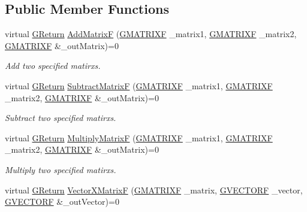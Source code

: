 \subsection*{Public Member Functions}
\begin{DoxyCompactItemize}
\item 
virtual \mbox{\hyperlink{namespace_g_w_a67a839e3df7ea8a5c5686613a7a3de21}{G\+Return}} \mbox{\hyperlink{class_g_w_1_1_m_a_t_h_1_1_g_matrix_a40f37f26a141222068d55994b8161cde}{Add\+MatrixF}} (\mbox{\hyperlink{struct_g_w_1_1_m_a_t_h_1_1_g_m_a_t_r_i_x_f}{G\+M\+A\+T\+R\+I\+XF}} \+\_\+matrix1, \mbox{\hyperlink{struct_g_w_1_1_m_a_t_h_1_1_g_m_a_t_r_i_x_f}{G\+M\+A\+T\+R\+I\+XF}} \+\_\+matrix2, \mbox{\hyperlink{struct_g_w_1_1_m_a_t_h_1_1_g_m_a_t_r_i_x_f}{G\+M\+A\+T\+R\+I\+XF}} \&\+\_\+out\+Matrix)=0
\begin{DoxyCompactList}\small\item\em Add two specified matirxs. \end{DoxyCompactList}\item 
virtual \mbox{\hyperlink{namespace_g_w_a67a839e3df7ea8a5c5686613a7a3de21}{G\+Return}} \mbox{\hyperlink{class_g_w_1_1_m_a_t_h_1_1_g_matrix_a0b744e7f36718b8cccf2423c88c43a30}{Subtract\+MatrixF}} (\mbox{\hyperlink{struct_g_w_1_1_m_a_t_h_1_1_g_m_a_t_r_i_x_f}{G\+M\+A\+T\+R\+I\+XF}} \+\_\+matrix1, \mbox{\hyperlink{struct_g_w_1_1_m_a_t_h_1_1_g_m_a_t_r_i_x_f}{G\+M\+A\+T\+R\+I\+XF}} \+\_\+matrix2, \mbox{\hyperlink{struct_g_w_1_1_m_a_t_h_1_1_g_m_a_t_r_i_x_f}{G\+M\+A\+T\+R\+I\+XF}} \&\+\_\+out\+Matrix)=0
\begin{DoxyCompactList}\small\item\em Subtract two specified matirxs. \end{DoxyCompactList}\item 
virtual \mbox{\hyperlink{namespace_g_w_a67a839e3df7ea8a5c5686613a7a3de21}{G\+Return}} \mbox{\hyperlink{class_g_w_1_1_m_a_t_h_1_1_g_matrix_a03ca7a7e5ad97849b9867d0210aa4bc0}{Multiply\+MatrixF}} (\mbox{\hyperlink{struct_g_w_1_1_m_a_t_h_1_1_g_m_a_t_r_i_x_f}{G\+M\+A\+T\+R\+I\+XF}} \+\_\+matrix1, \mbox{\hyperlink{struct_g_w_1_1_m_a_t_h_1_1_g_m_a_t_r_i_x_f}{G\+M\+A\+T\+R\+I\+XF}} \+\_\+matrix2, \mbox{\hyperlink{struct_g_w_1_1_m_a_t_h_1_1_g_m_a_t_r_i_x_f}{G\+M\+A\+T\+R\+I\+XF}} \&\+\_\+out\+Matrix)=0
\begin{DoxyCompactList}\small\item\em Multiply two specified matirxs. \end{DoxyCompactList}\item 
virtual \mbox{\hyperlink{namespace_g_w_a67a839e3df7ea8a5c5686613a7a3de21}{G\+Return}} \mbox{\hyperlink{class_g_w_1_1_m_a_t_h_1_1_g_matrix_a8e1b421243bebab184ca0237e163fa2d}{Vector\+X\+MatrixF}} (\mbox{\hyperlink{struct_g_w_1_1_m_a_t_h_1_1_g_m_a_t_r_i_x_f}{G\+M\+A\+T\+R\+I\+XF}} \+\_\+matrix, \mbox{\hyperlink{struct_g_w_1_1_m_a_t_h_1_1_g_v_e_c_t_o_r_f}{G\+V\+E\+C\+T\+O\+RF}} \+\_\+vector, \mbox{\hyperlink{struct_g_w_1_1_m_a_t_h_1_1_g_v_e_c_t_o_r_f}{G\+V\+E\+C\+T\+O\+RF}} \&\+\_\+out\+Vector)=0

\end{DoxyCompactItemize}
